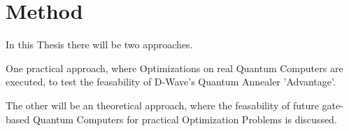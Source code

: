 \section{Method}

In this Thesis there will be two approaches.

One practical approach, where Optimizations on real Quantum Computers are executed,
to test the feasability of D-Wave's Quantum Annealer 'Advantage'.

The other will be an theoretical approach, where the feasability of future gate-based Quantum Computers
for practical Optimization Problems is discussed.
